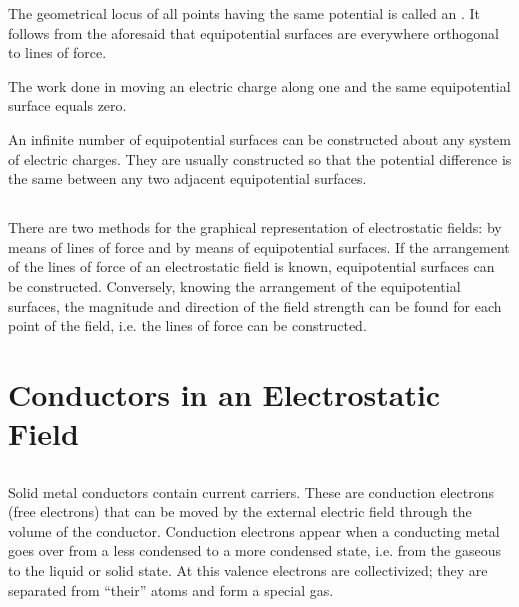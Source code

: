 The geometrical locus of all points having the same potential is called an . It follows from the aforesaid that equipotential surfaces are everywhere orthogonal to lines of force.

The work done in moving an electric charge along one and the same equipotential surface equals zero.

An infinite number of equipotential surfaces can be constructed about any system of electric charges. They are usually constructed so that the potential difference is the same between any two adjacent equipotential surfaces.

\subsection{}\label{16.3.5} There are two methods for the graphical representation of electrostatic fields: by means of lines of force and by means of equipotential surfaces. If the arrangement of the lines of force of an electrostatic field is known, equipotential surfaces can be constructed. Conversely, knowing the arrangement of the equipotential surfaces, the magnitude and direction of the field strength can be found for each point of the field, i.e. the lines of force can be constructed.


\section{Conductors in an Electrostatic Field}
\label{sec-16.4}

\subsection{}\label{16.4.1} Solid metal conductors contain current carriers. These are conduction electrons (free electrons) that can be moved by the external electric field through the volume of the conductor. Conduction electrons appear when a conducting metal goes over from a less condensed to a more condensed state, i.e. from the gaseous to the liquid or solid state. At this valence electrons  are collectivized; they are separated from ``their'' atoms and form a special  gas.

